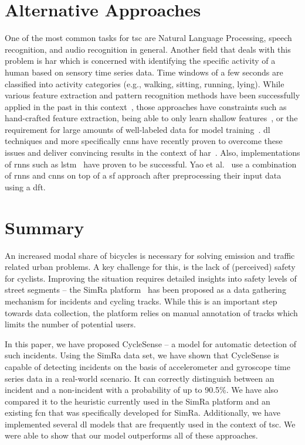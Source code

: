 \section{Alternative Approaches}
\label{sec:related_work_cyclesense}
One of the most common tasks for \ac{tsc} are Natural Language Processing, speech recognition, and audio recognition in general.
Another field that deals with this problem is \acf{har} which is concerned with identifying the specific activity of a human based on sensory time series data.
Time windows of a few seconds are classified into activity categories (e.g., walking, sitting, running, lying).
While various feature extraction and pattern recognition methods have been successfully applied in the past in this context~\cite{bulling2014tutorial}, those approaches have constraints such as hand-crafted feature extraction, being able to only learn shallow features~\cite{yang2015deep}, or the requirement for large amounts of well-labeled data for model training~\cite{wang2019deep}.
\acl{dl} techniques and more specifically \acp{cnn} have recently proven to overcome these issues and deliver convincing results in the context of \ac{har}~\cite{wang2019deep,ronao2015deep}.
Also, implementations of \acp{rnn} such as \ac{lstm}~\cite{tao2016multicolumn,yao2017deepsense} have proven to be successful.
Yao et al.\ \cite{yao2017deepsense} use a combination of \acp{rnn} and \acp{cnn} on top of a \ac{sf} approach after preprocessing their input data using a \ac{dft}.

\section{Summary}
\label{sec:summary_cyclesense}
An increased modal share of bicycles is necessary for solving emission and traffic related urban problems.
A key challenge for this, is the lack of (perceived) safety for cyclists.
Improving the situation requires detailed insights into safety levels of street segments -- the SimRa platform~\cite{karakaya2020simra} has been proposed as a data gathering mechanism for incidents and cycling tracks.
While this is an important step towards data collection, the platform relies on manual annotation of tracks which limits the number of potential users.

In this paper, we have proposed CycleSense -- a model for automatic detection of such incidents.
Using the SimRa data set, we have shown that CycleSense is capable of detecting incidents on the basis of accelerometer and gyroscope time series data in a real-world scenario.
It can correctly distinguish between an incident and a non-incident with a probability of up to 90.5\%.
We have also compared it to the heuristic currently used in the SimRa platform and an existing \ac{fcn} that was specifically developed for SimRa.
Additionally, we have implemented several \ac{dl} models that are frequently used in the context of \ac{tsc}.
We were able to show that our model outperforms all of these approaches.

